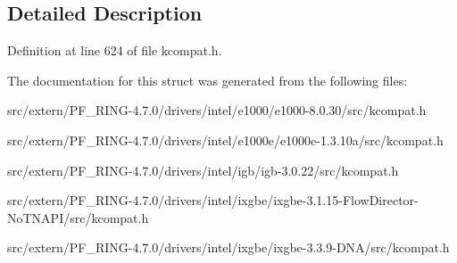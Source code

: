 \subsection{Detailed Description}


Definition at line 624 of file kcompat.h.



The documentation for this struct was generated from the following files:\begin{DoxyCompactItemize}
\item 
src/extern/PF\_\-RING-\/4.7.0/drivers/intel/e1000/e1000-\/8.0.30/src/kcompat.h\item 
src/extern/PF\_\-RING-\/4.7.0/drivers/intel/e1000e/e1000e-\/1.3.10a/src/kcompat.h\item 
src/extern/PF\_\-RING-\/4.7.0/drivers/intel/igb/igb-\/3.0.22/src/kcompat.h\item 
src/extern/PF\_\-RING-\/4.7.0/drivers/intel/ixgbe/ixgbe-\/3.1.15-\/FlowDirector-\/NoTNAPI/src/kcompat.h\item 
src/extern/PF\_\-RING-\/4.7.0/drivers/intel/ixgbe/ixgbe-\/3.3.9-\/DNA/src/kcompat.h\end{DoxyCompactItemize}
